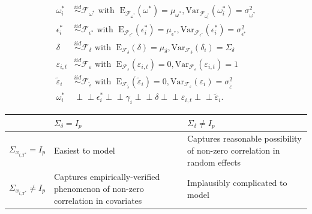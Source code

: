 \documentclass[11pt]{article}
\newcommand{\simiid}{\stackrel{iid}{\sim}} %
\newcommand{\indep}{\perp \!\!\! \perp } %
\def\mrm#1{\mathrm{#1}} %
\def\t#1{\tilde{#1}} %
\def\mc#1{\mathcal{#1}} %
\def\mc#1{\mathcal{#1}}
\theoremstyle{definition}
\begin{document}
\begin{align*}
\omega^{*}_i &\simiid \mc{F}_{\omega^{*}} \text{ with }  \; \mrm{E}_{\mc{F}_{\omega^{*}}}(\omega^{*}) = \mu_{\omega^{*}}, \mrm{Var}_{\mc{F}_{\omega^{*}_i}}(\omega^{*}_i)  = \sigma^2_{\omega^{*}}  \\
\epsilon^{*}_i &\simiid \mc{F}_{\epsilon^{*}} \text{ with }  \; \mrm{E}_{\mc{F}_{\epsilon^{*}}}(\epsilon^{*}_i) = \mu_{\epsilon^{*}}, \mrm{Var}_{\mc{F}_{\epsilon^{*}}}(\epsilon^{*}_i)  = \sigma^2_{\epsilon^{*}}  \\
\delta &\simiid \mc{F}_{\delta} \text{ with }  \; \mrm{E}_{\mc{F}_{\delta}}(\delta) = \mu_{\delta}, \mrm{Var}_{\mc{F}_{\delta}}(\delta_i)  = \Sigma_{\delta} \\
\varepsilon_{i,t} & \simiid  \mc{F}_{\varepsilon} \text{ with }  \; \mrm{E}_{\mc{F}_{\varepsilon}}(\varepsilon_{i,t}) = 0, \mrm{Var}_{\mc{F}_{\varepsilon}}(\varepsilon_{i,t})  = 1 \\
\t\varepsilon_{i} & \simiid  \mc{F}_{\t\varepsilon} \text{ with }  \; \mrm{E}_{\mc{F}_{\t\varepsilon}}(\t\varepsilon_{i}) = 0, \mrm{Var}_{\mc{F}_{\varepsilon}}(\varepsilon_{i})  = \sigma^2_{\t\varepsilon} \\
\omega^{*}_i &\indep  \epsilon^{*}_i \indep \gamma_i \indep \delta \indep \varepsilon_{i,t} \indep \t\varepsilon_{i}.
\end{align*}

\begin{table}[]
\begin{tabular}{|p{1.2in}|p{1.9in}|p{1.9in}|}
\hline
  & $\Sigma_{\delta} = I_{p}$ & $\Sigma_{\delta} \neq I_{p}$  \\ \hline
 $\Sigma_{x_{i,T^{*}}} = I_{p}$ & Easiest to model & Captures reasonable possibility of non-zero correlation in random effects \\ \hline
 $\Sigma_{x_{i,T^{*}}} \neq I_{p}$ & Captures empirically-verified phenomenon of non-zero correlation in covariates & Implausibly complicated to model  \\ \hline
\end{tabular}
\end{table}
\end{document}
